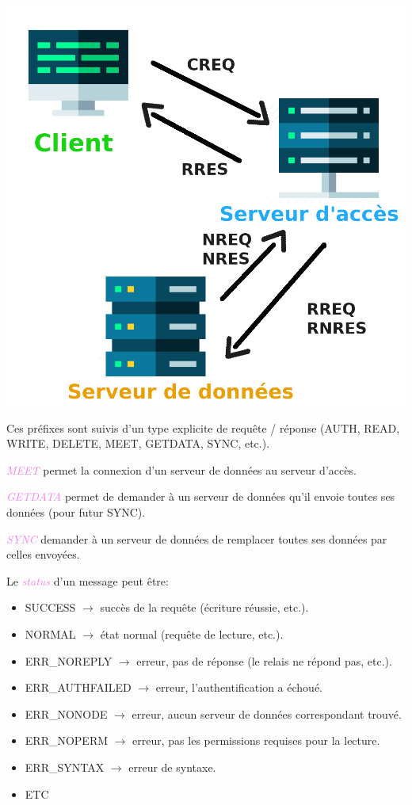 \documentclass[a4paper]{article}
\newcommand{\ra}{\rightarrow}
\let\oldtextit\textit
\renewcommand{\textit}[1]{\textcolor{violet}{\oldtextit{#1}}}
\begin{document}
\begin{center}
    \includegraphics[scale=0.2]{img/req.png}
\end{center}

Ces préfixes sont suivis d'un type explicite de requête / réponse (AUTH, READ, WRITE, DELETE, MEET, GETDATA, SYNC, etc.).

\textit{MEET} permet la connexion d'un serveur de données au serveur d'accès.

\textit{GETDATA} permet de demander à un serveur de données qu'il envoie toutes ses données (pour futur SYNC).

\textit{SYNC} demander à un serveur de données de remplacer toutes ses données par celles envoyées.

Le \textit{status} d'un message peut être:
\begin{itemize}
    \item SUCCESS $\ra$ succès de la requête (écriture réussie, etc.).
    \item NORMAL $\ra$ état normal (requête de lecture, etc.).
    \item ERR\_NOREPLY $\ra$ erreur, pas de réponse (le relais ne répond pas, etc.).
    \item ERR\_AUTHFAILED $\ra$ erreur, l'authentification a échoué.
    \item ERR\_NONODE $\ra$ erreur, aucun serveur de données correspondant trouvé.
    \item ERR\_NOPERM $\ra$ erreur, pas les permissions requises pour la lecture.
    \item ERR\_SYNTAX $\ra$ erreur de syntaxe.
    \item ETC
\end{itemize}
\end{document}
